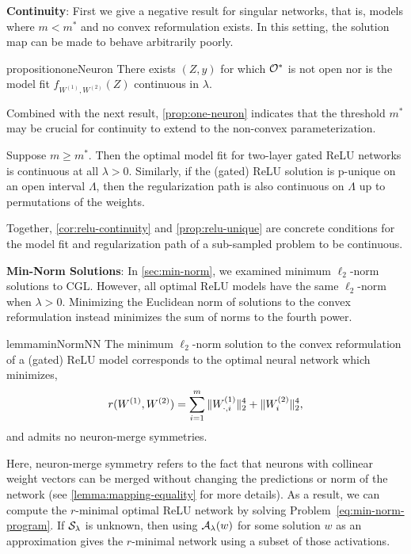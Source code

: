 \textbf{Continuity}:
First we give a negative result for singular networks, that is, models
where \( m < m^* \) and no convex reformulation exists.
In this setting, the solution map can be made to behave
arbitrarily poorly.
\begin{restatable}{proposition}{oneNeuron}\label{prop:one-neuron}
    There exists \( (Z, y) \) for which \( \mathcal{O}^* \)
    is not open nor is the model fit \( f_{W^{(1)}, W^{(2)}}(Z) \) continuous in
    \( \lambda \).
\end{restatable}
Combined with the next result, \cref{prop:one-neuron} indicates
that the threshold \( m^* \) may be crucial for continuity to extend
to the non-convex parameterization.
\begin{corollary}\label{cor:relu-continuity}
    Suppose \( m \geq m^* \).
    Then the optimal model fit for two-layer gated ReLU networks
    is continuous at all \( \lambda > 0 \).
    Similarly, if the (gated) ReLU solution is p-unique on an open
    interval \( \Lambda \), then the regularization path is also continuous
    on \( \Lambda \) up to permutations of the weights.
\end{corollary}
Together, \cref{cor:relu-continuity} and \cref{prop:relu-unique}
are concrete conditions for the model fit and regularization path
of a sub-sampled problem to be continuous.

\textbf{Min-Norm Solutions}:
In \cref{sec:min-norm}, we examined minimum \( \ell_2 \)-norm solutions to CGL.
However, all optimal ReLU models have the same
\( \ell_2 \)-norm when \( \lambda > 0 \).
Minimizing the Euclidean norm of solutions to the convex reformulation instead
minimizes the sum of norms to the fourth power.
\begin{restatable}{lemma}{minNormNN}\label{lemma:min-norm-nn}
    The minimum \( \ell_2 \)-norm solution to the convex reformulation
    of a (gated) ReLU model corresponds to the
    optimal neural network which minimizes,
    \[
        r(W^{(1)}, W^{(2)}) = \sum_{i = 1}^m \|W^{(1)}_{\cdot, i}\|_2^4 + \|W^{(2)}_{i}\|_2^4,
    \]
    and admits no neuron-merge symmetries.
\end{restatable}

Here, neuron-merge symmetry refers to the fact that neurons with collinear
weight vectors can be merged without changing the predictions or norm of
the network (see \cref{lemma:mapping-equality} for more details).
As a result, we can compute the \( r \)-minimal optimal ReLU network
by solving Problem~\eqref{eq:min-norm-program}.
If \( \mathcal{S}_\lambda \) is unknown, then using \( {\mathcal{A}_{\lambda}}(w) \) for some solution
\( w \) as an approximation gives the \( r \)-minimal network
using a subset of those activations.

